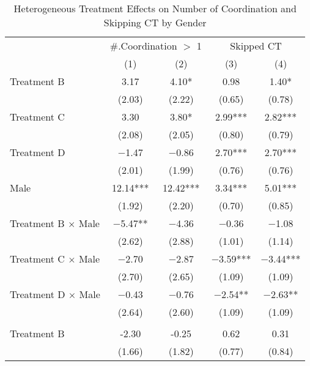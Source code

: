 \documentclass[12pt, a4paper]{article}
\begin{document}
\begin{table}[H]

\caption{\label{tab:lm-interaction-gender-skip}Heterogeneous Treatment Effects on Number of Coordination and Skipping CT by Gender}
\centering
\fontsize{8}{10}\selectfont
\begin{threeparttable}
\begin{tabular}[t]{lcccc}
\toprule
\multicolumn{1}{c}{ } & \multicolumn{2}{c}{\#.Coordination $>$ 1} & \multicolumn{2}{c}{Skipped CT} \\
\cmidrule(l{3pt}r{3pt}){2-3} \cmidrule(l{3pt}r{3pt}){4-5}
  & (1) & (2) & (3) & (4)\\
\midrule
Treatment B & \num{3.17} & \num{4.10}* & \num{0.98} & \num{1.40}*\\
 & (\num{2.03}) & (\num{2.22}) & (\num{0.65}) & (\num{0.78})\\
Treatment C & \num{3.30} & \num{3.80}* & \num{2.99}*** & \num{2.82}***\\
 & (\num{2.08}) & (\num{2.05}) & (\num{0.80}) & (\num{0.79})\\
Treatment D & \num{-1.47} & \num{-0.86} & \num{2.70}*** & \num{2.70}***\\
 & (\num{2.01}) & (\num{1.99}) & (\num{0.76}) & (\num{0.76})\\
Male & \num{12.14}*** & \num{12.42}*** & \num{3.34}*** & \num{5.01}***\\
 & (\num{1.92}) & (\num{2.20}) & (\num{0.70}) & (\num{0.85})\\
Treatment B $\times$ Male & \num{-5.47}** & \num{-4.36} & \num{-0.36} & \num{-1.08}\\
 & (\num{2.62}) & (\num{2.88}) & (\num{1.01}) & (\num{1.14})\\
Treatment C $\times$ Male & \num{-2.70} & \num{-2.87} & \num{-3.59}*** & \num{-3.44}***\\
 & (\num{2.70}) & (\num{2.65}) & (\num{1.09}) & (\num{1.09})\\
Treatment D $\times$ Male & \num{-0.43} & \num{-0.76} & \num{-2.54}** & \num{-2.63}**\\
 & (\num{2.64}) & (\num{2.60}) & (\num{1.09}) & (\num{1.09})\\
\midrule
\addlinespace[0.3em]
\multicolumn{5}{l}{\textbf{Linear combination test: Treatment + Treatment $\times$ Male}}\\
\hspace{1em}Treatment B & -2.30 & -0.25 & 0.62 & 0.31\\
\hspace{1em} & (1.66) & (1.82) & (0.77) & (0.84)\\

\end{tabular}
\end{threeparttable}
\end{table}
\end{document}
